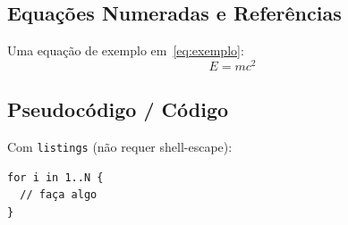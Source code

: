 \subsection{Equações Numeradas e Referências}
Uma equação de exemplo em~\eqref{eq:exemplo}:
\begin{equation}
  E = m c^{2}
  \label{eq:exemplo}
\end{equation}

\subsection{Pseudocódigo / Código}
Com \texttt{listings} (não requer shell-escape):
\begin{lstlisting}[style=code, caption={Exemplo com listings}, label={lst:listings-exemplo}]
for i in 1..N {
  // faça algo
}
\end{lstlisting}

